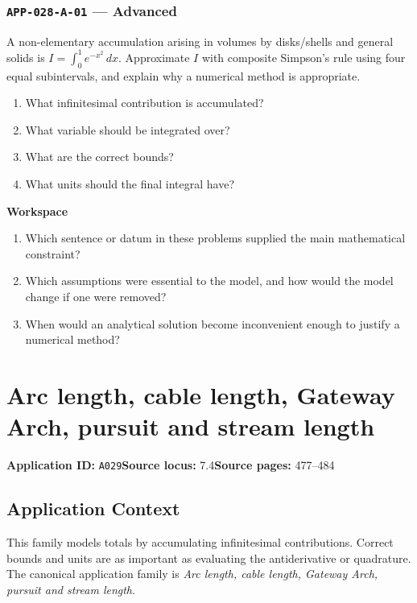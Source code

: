 \documentclass[11pt]{book}
\newcommand{\pid}[1]{\texttt{#1}}
\newcommand{\workspace}{\par\vspace{0.7in}\hrulefill\par\vspace{0.55in}\hrulefill\par}
\begin{document}
\subsection*{\pid{APP-028-A-01} — Advanced}
\begin{problembox}
A non-elementary accumulation arising in volumes by disks/shells and general solids is $I=\int_0^1 e^{-x^2}\,dx$. Approximate $I$ with composite Simpson's rule using four equal subintervals, and explain why a numerical method is appropriate.
\end{problembox}
\begin{promptbox}\begin{enumerate}
\item What infinitesimal contribution is accumulated?
\item What variable should be integrated over?
\item What are the correct bounds?
\item What units should the final integral have?
\end{enumerate}\end{promptbox}
\textbf{Workspace}\workspace
\begin{reflectionbox}\begin{enumerate}
\item Which sentence or datum in these problems supplied the main mathematical constraint?
\item Which assumptions were essential to the model, and how would the model change if one were removed?
\item When would an analytical solution become inconvenient enough to justify a numerical method?
\end{enumerate}\end{reflectionbox}
\chapter{Arc length, cable length, Gateway Arch, pursuit and stream length}\label{app:A029}
\textbf{Application ID:} \pid{A029}\quad \textbf{Source locus:} 7.4\quad \textbf{Source pages:} 477–484
\section*{Application Context}
This family models totals by accumulating infinitesimal contributions. Correct bounds and units are as important as evaluating the antiderivative or quadrature. The canonical application family is \emph{Arc length, cable length, Gateway Arch, pursuit and stream length}.
\end{document}
